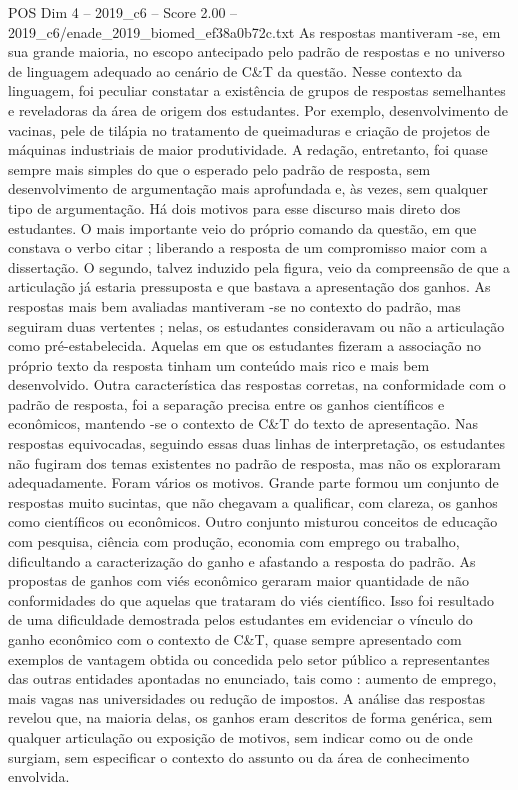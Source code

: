 \begin{textsample}{POS Dim 4 – 2019\_c6 – Score 2.00 – 2019\_c6/enade\_2019\_biomed\_ef38a0b72c.txt}
As respostas mantiveram -se, em sua grande maioria, no escopo antecipado pelo padrão de respostas e no universo de linguagem adequado ao cenário de C\&T da questão.
Nesse contexto da linguagem, foi peculiar constatar a existência de grupos de respostas semelhantes e reveladoras da área de origem dos estudantes.
Por exemplo, desenvolvimento de vacinas, pele de tilápia no tratamento de queimaduras e criação de projetos de máquinas industriais de maior produtividade.
A redação, entretanto, foi quase sempre mais simples do que o esperado pelo padrão de resposta, sem desenvolvimento de argumentação mais aprofundada e, às vezes, sem qualquer tipo de argumentação.
Há dois motivos para esse discurso mais direto dos estudantes.
O mais importante veio do próprio comando da questão, em que constava o verbo citar ; liberando a resposta de um compromisso maior com a dissertação.
O segundo, talvez induzido pela figura, veio da compreensão de que a articulação já estaria pressuposta e que bastava a apresentação dos ganhos.
As respostas mais bem avaliadas mantiveram -se no contexto do padrão, mas seguiram duas vertentes ; nelas, os estudantes consideravam ou não a articulação como pré-estabelecida.
Aquelas em que os estudantes fizeram a associação no próprio texto da resposta tinham um conteúdo mais rico e mais bem desenvolvido.
Outra característica das respostas corretas, na conformidade com o padrão de resposta, foi a separação precisa entre os ganhos científicos e econômicos, mantendo -se o contexto de C\&T do texto de apresentação.
Nas respostas equivocadas, seguindo essas duas linhas de interpretação, os estudantes não fugiram dos temas existentes no padrão de resposta, mas não os exploraram adequadamente.
Foram vários os motivos.
Grande parte formou um conjunto de respostas muito sucintas, que não chegavam a qualificar, com clareza, os ganhos como científicos ou econômicos.
Outro conjunto misturou conceitos de educação com pesquisa, ciência com produção, economia com emprego ou trabalho, dificultando a caracterização do ganho e afastando a resposta do padrão.
As propostas de ganhos com viés econômico geraram maior quantidade de não conformidades do que aquelas que trataram do viés científico.
Isso foi resultado de uma dificuldade demostrada pelos estudantes em evidenciar o vínculo do ganho econômico com o contexto de C\&T, quase sempre apresentado com exemplos de vantagem obtida ou concedida pelo setor público a representantes das outras entidades apontadas no enunciado, tais como : aumento de emprego, mais vagas nas universidades ou redução de impostos.
A análise das respostas revelou que, na maioria delas, os ganhos eram descritos de forma genérica, sem qualquer articulação ou exposição de motivos, sem indicar como ou de onde surgiam, sem especificar o contexto do assunto ou da área de conhecimento envolvida.

\end{textsample}
